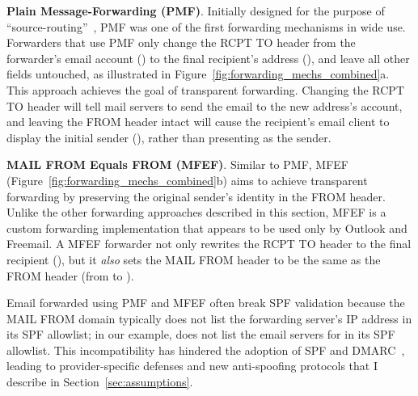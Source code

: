 
\textbf{Plain Message-Forwarding (PMF)}. Initially designed for
the purpose of ``source-routing''~\cite{Emailfor45:online}, PMF was
one of the first forwarding mechanisms in wide use.
Forwarders that use PMF only change
the \textsc{RCPT TO} header from the forwarder's email account () to the final recipient's address (), and leave all other fields
untouched,
as illustrated in Figure~\ref{fig:forwarding_mechs_combined}a.
This approach achieves the goal of transparent forwarding.
Changing the \textsc{RCPT TO} header will tell mail servers to send the email to the new address's account, and leaving the \textsc{FROM} header intact will
cause the recipient's email client to display the initial sender (),
rather than presenting  as the sender.


\textbf{MAIL FROM Equals FROM (MFEF)}.
Similar to PMF, MFEF (Figure~\ref{fig:forwarding_mechs_combined}b) aims to achieve transparent forwarding by preserving the original sender's identity in the \textsc{FROM} header.
Unlike the other forwarding approaches described in this section, MFEF is a custom forwarding implementation that appears to be used only by Outlook and Freemail.
A MFEF forwarder not only rewrites the \textsc{RCPT TO} header to the final recipient (), but it \emph{also} sets the \textsc{MAIL FROM}
header to be the same as the \textsc{FROM} header (from  to ).

Email forwarded using PMF and MFEF often break SPF validation because the \textsc{MAIL FROM} domain typically does not list the forwarding server's IP address in its SPF allowlist;
in our example,  does not list the email servers for  in its SPF allowlist.
This incompatibility has hindered the adoption of SPF and DMARC~\cite{hutowardsunderstanding},
leading to provider-specific defenses and new anti-spoofing protocols that I describe in Section~\ref{sec:assumptions}.

